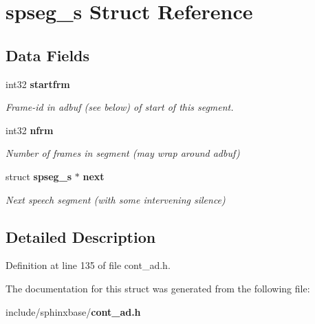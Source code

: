 \section{spseg\-\_\-s \-Struct \-Reference}
\label{structspseg__s}
\subsection*{\-Data \-Fields}
\begin{DoxyCompactItemize}
\item 
int32 {\bf startfrm}\label{structspseg__s_a0f62769ff904df2d374b9500a210374f}

\begin{DoxyCompactList}\small\item\em \-Frame-\/id in adbuf (see below) of start of this segment. \end{DoxyCompactList}\item 
int32 {\bf nfrm}\label{structspseg__s_a91271dd1e4a57bfe1c468e216f7dd42f}

\begin{DoxyCompactList}\small\item\em \-Number of frames in segment (may wrap around adbuf) \end{DoxyCompactList}\item 
struct {\bf spseg\-\_\-s} $\ast$ {\bf next}\label{structspseg__s_aec01e1c543395710d3510e18f0938b1a}

\begin{DoxyCompactList}\small\item\em \-Next speech segment (with some intervening silence) \end{DoxyCompactList}\end{DoxyCompactItemize}


\subsection{\-Detailed \-Description}


\-Definition at line 135 of file cont\-\_\-ad.\-h.



\-The documentation for this struct was generated from the following file\-:\begin{DoxyCompactItemize}
\item 
include/sphinxbase/{\bf cont\-\_\-ad.\-h}\end{DoxyCompactItemize}
